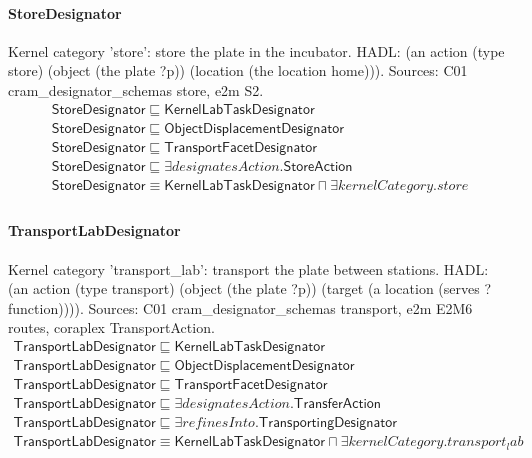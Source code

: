 \documentclass[10pt]{article}
\begin{document}
\paragraph{StoreDesignator} Kernel category 'store': store the plate in the incubator. HADL: (an action (type store) (object (the plate ?p)) (location (the location home))). Sources: C01 cram\_designator\_schemas store, e2m S2.
\[\begin{array}{l}
\mathsf{StoreDesignator} \sqsubseteq  \mathsf{KernelLabTaskDesignator} \\
\mathsf{StoreDesignator} \sqsubseteq  \mathsf{ObjectDisplacementDesignator} \\
\mathsf{StoreDesignator} \sqsubseteq  \mathsf{TransportFacetDesignator} \\
\mathsf{StoreDesignator} \sqsubseteq  \exists \mathit{designatesAction}.\mathsf{StoreAction} \\
\mathsf{StoreDesignator} \equiv  \mathsf{KernelLabTaskDesignator} \sqcap  \exists \mathit{kernelCategory}.{store} \\
\end{array}\]
\paragraph{TransportLabDesignator} Kernel category 'transport\_lab': transport the plate between stations. HADL: (an action (type transport) (object (the plate ?p)) (target (a location (serves ?function)))). Sources: C01 cram\_designator\_schemas transport, e2m E2M6 routes, coraplex TransportAction.
\[\begin{array}{l}
\mathsf{TransportLabDesignator} \sqsubseteq  \mathsf{KernelLabTaskDesignator} \\
\mathsf{TransportLabDesignator} \sqsubseteq  \mathsf{ObjectDisplacementDesignator} \\
\mathsf{TransportLabDesignator} \sqsubseteq  \mathsf{TransportFacetDesignator} \\
\mathsf{TransportLabDesignator} \sqsubseteq  \exists \mathit{designatesAction}.\mathsf{TransferAction} \\
\mathsf{TransportLabDesignator} \sqsubseteq  \exists \mathit{refinesInto}.\mathsf{TransportingDesignator} \\
\mathsf{TransportLabDesignator} \equiv  \mathsf{KernelLabTaskDesignator} \sqcap  \exists \mathit{kernelCategory}.{transport_lab} \\
\end{array}\]
\end{document}
